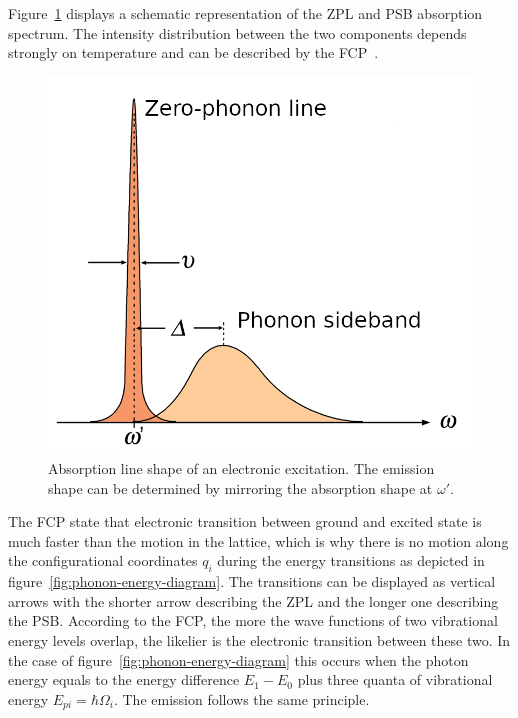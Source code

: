 Figure~\ref{fig:line-shape} displays a schematic representation of the \ac{ZPL} and \ac{PSB} absorption spectrum.
The intensity distribution between the two components depends strongly on temperature and can be described by the \ac{FCP}~\cite{franck_elementary_1926}.
\begin{figure}[H]
	\centering
	\includegraphics[width=0.5\linewidth]{figures/quantum-dot/Line-shape}
	\caption[Absorption line shape of an electronic excitation.]{Absorption line shape of an electronic excitation.
		The emission shape can be determined by mirroring the absorption shape at $\omega'$.}
	\label{fig:line-shape}
\end{figure}
The \ac{FCP} state that electronic transition between ground and excited state is much faster than the motion in the lattice, which is why there is no motion along the configurational coordinates $q_i$ during the energy transitions as depicted in figure~\ref{fig:phonon-energy-diagram}.
The transitions can be displayed as vertical arrows with the shorter arrow describing the \ac{ZPL} and the longer one describing the \ac{PSB}.
According to the \ac{FCP}, the more the wave functions of two vibrational energy levels overlap, the likelier is the electronic transition between these two.
In the case of figure~\ref{fig:phonon-energy-diagram} this occurs when the photon energy equals to the energy difference $E_1-E_0$ plus three quanta of vibrational energy $E_{pi} = \hbar \Omega_i$.
The emission follows the same principle.
